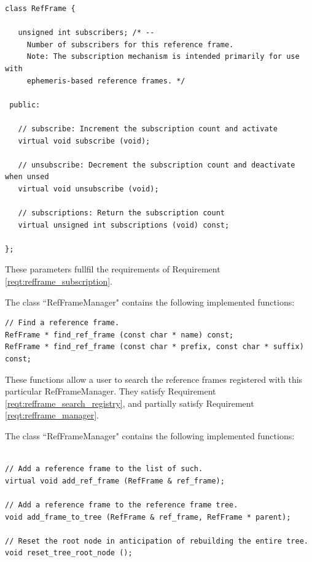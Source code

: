 \begin{verbatim}
class RefFrame {

   unsigned int subscribers; /* --
     Number of subscribers for this reference frame.
     Note: The subscription mechanism is intended primarily for use with
     ephemeris-based reference frames. */

 public:

   // subscribe: Increment the subscription count and activate
   virtual void subscribe (void);

   // unsubscribe: Decrement the subscription count and deactivate when unsed
   virtual void unsubscribe (void);

   // subscriptions: Return the subscription count
   virtual unsigned int subscriptions (void) const;

};

\end{verbatim}

These parameters fullfil the requirements of Requirement
\ref{reqt:refframe_subscription}.

\label{inspect:refframe_manager}

The class ``RefFrameManager" contains the following implemented functions:

\begin{verbatim}
// Find a reference frame.
RefFrame * find_ref_frame (const char * name) const;
RefFrame * find_ref_frame (const char * prefix, const char * suffix) const;
\end{verbatim}

These functions allow a user to search the reference frames registered with this
particular RefFrameManager. They satisfy
Requirement \ref{reqt:refframe_search_registry}, and partially
satisfy Requirement \ref{reqt:refframe_manager}.

The class ``RefFrameManager" contains the following implemented functions:

\begin{verbatim}

// Add a reference frame to the list of such.
virtual void add_ref_frame (RefFrame & ref_frame);

// Add a reference frame to the reference frame tree.
void add_frame_to_tree (RefFrame & ref_frame, RefFrame * parent);

// Reset the root node in anticipation of rebuilding the entire tree.
void reset_tree_root_node ();

\end{verbatim}

